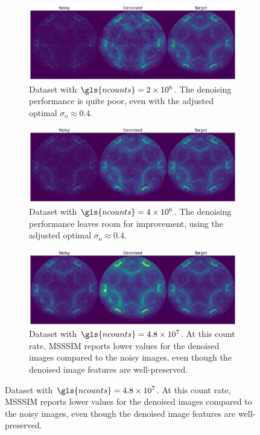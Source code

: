 \begin{figure}
    \centering

    \begin{subfigure}[b]{1\linewidth}
        \centering
        \includegraphics[width=1\linewidth]{images/noisy_denoised_ref_2M_avg_bm3d.pdf}
        \caption{Dataset with $\gls{ncounts}=\num{2e6}$. The denoising performance is quite poor, even with the adjusted optimal $\sigma_{\text{o}}\approx0.4$.}
        \label{fig:noisy-denoised-ref-2M-avg-bm3d}
    \end{subfigure}

    \begin{subfigure}[b]{1\linewidth}
        \centering
        \includegraphics[width=1\linewidth]{images/noisy_denoised_ref_4M_avg_bm3d.pdf}
        \caption{Dataset with $\gls{ncounts}=\num{4e6}$. The denoising performance leaves room for improvement, using the adjusted optimal $\sigma_{\text{o}}\approx0.4$.}
        \label{fig:noisy-denoised-ref-4M-avg-bm3d}
    \end{subfigure}

    \begin{subfigure}[b]{1\linewidth}
        \centering
        \includegraphics[width=1\linewidth]{images/noisy_denoised_ref_48M_avg_bm3d.pdf}
        \caption{Dataset with $\gls{ncounts}=\num{4.8e7}$. At this count rate, \gls{MSSSIM} reports lower values for the denoised images compared to the noisy images, even though the denoised image features are well-preserved.}
        \label{fig:noisy-denoised-ref-48M-avg-bm3d}
    \end{subfigure}


\end{figure}
